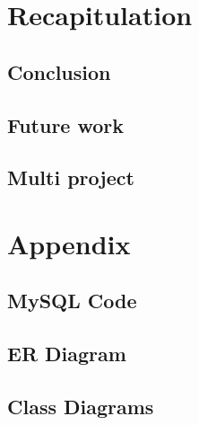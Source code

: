 \chapter{Recapitulation}
  \section{Conclusion}
  \section{Future work}
  \section{Multi project} %

\appendix
	\chapter{Appendix}
	\section{MySQL Code}
	\label{MySQLcode}
		
	\section{ER Diagram}
	\label{errDiagram}
		
	\section{Class Diagrams}
	\label{app:Class-diagrams}
		
        



\appendix


